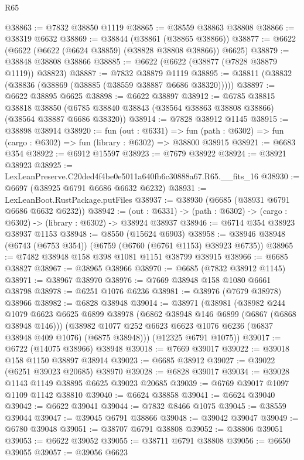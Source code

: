 \begin{lexlean}{R65}
\begin{coremodule}
{@38863 := @7832 @38850 @1119
@38865 := @38559 @38863 @38808
@38866 := @38319 @6632
@38869 := @38844 (@38861 (@38865 @38866))
@38877 := @6622 (@6622 (@6622 (@6624 @38859) (@38828 @38808 @38866)) @6625)
@38879 := @38848 @38808 @38866
@38885 := @6622 (@6622 (@38877 (@7828 @38879 @1119)) @38823)
@38887 := @7832 @38879 @1119
@38895 := @38811 (@38832 (@38836 (@38869 (@38885 (@38559 @38887 @6686 @38320)))))
@38897 := @6622 @38895 @6625
@38898 := @6622 @38897
@38912 := @6785
    @38815
    @38818
    @38850
    (@6785 @38840 @38843 (@38564 @38863 @38808 @38866) (@38564 @38887 @6686 @38320))
@38914 := @7828 @38912 @1145
@38915 := @38898 @38914
@38920 := fun (out : @6331) =>
  fun (path : @6302) => fun (cargo : @6302) => fun (library : @6302) => @38800 @38915
@38921 := @6683 @354
@38922 := @6912 @15597
@38923 := @7679 @38922
@38924 := @38921 @38923
@38925 := LexLeanPreserve.C20ded4f4be0e5011a640fb6c30888a67.R65.__fits_16
@38930 := @6697 (@38925 @6791 @6686 @6632 @6232)
@38931 := LexLeanBoot.RustPackage.putFiles
@38937 := @38930 (@6685 (@38931 @6791 @6686 @6632 @6232))
@38942 := (out : @6331) -> (path : @6302) -> (cargo : @6302) -> (library : @6302) -> @38924 @38937
@38946 := @6714 @354 @38923 @38937 @1153
@38948 := @8550 (@15624 @6903)
@38958 := @38946 @38948 (@6743 (@6753 @354)) (@6759 (@6760 (@6761 @1153) @38923 @6735))
@38965 := @7482 @38948 @158 @398 @1081 @1151 @38799 @38915
@38966 := @6685 @38827
@38967 := @38965 @38966
@38970 := @6685 (@7832 @38912 @1145)
@38971 := @38967 @38970
@38976 := @7669 @38948 @158 @1080 @6661 @38798
@38978 := @6251 @1076 @6236
@38981 := @38976 (@7679 @38978) @38966
@38982 := @6828 @38948
@39014 := @38971
    (@38981
      (@38982
        @244
        @1079
        @6623
        @6625
        @6899
        @38978
        (@6862 @38948 @146 @6899 (@6867 (@6868 @38948 @146)))
        (@38982 @1077 @252 @6623 @6623 @1076 @6236 (@6837 @38948 @409 @1076) (@6875 @38948)))
      (@12325 @6791 @1075))
@39017 := @6722 (@14075 @38966) @38948
@39018 := @7669 @39017
@39022 := @39018 @158 @1150 @38897 @38914
@39023 := @6685 @38912
@39027 := @39022 (@6251 @39023 @20685) @38970
@39028 := @6828 @39017
@39034 := @39028 @1143 @1149 @38895 @6625 @39023 @20685
@39039 := @6769 @39017 @1097 @1109 @1142 @38810
@39040 := @6624 @38858
@39041 := @6624 @39040
@39042 := @6622 @39041
@39044 := @7832 @8466 @1075
@39045 := @38559 @39044
@39047 := @39045 @6791 @38866
@39048 := @39042 @39047
@39049 := @6780 @39048
@39051 := @38707 @6791 @38808
@39052 := @38806 @39051
@39053 := @6622 @39052
@39055 := @38711 @6791 @38808
@39056 := @6650 @39055
@39057 := @39056 @6623
}
\end{coremodule}
\end{lexlean}
